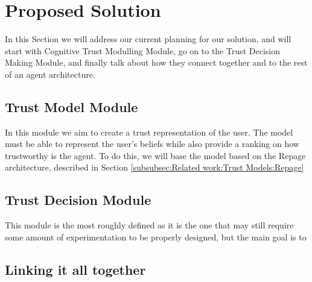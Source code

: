 \section{Proposed Solution}
\label{sec:Solution}
In this Section we will address our current planning for our solution, and will start with Cognitive Trust Modulling Module, go on to the Trust Decision Making Module, and finally talk about how they connect together and to the rest of an agent architecture.


\subsection{Trust Model Module}
\label{subsec:Solution:Trust Assessment Module}
In this module we aim to create a trust representation of the user. The model must be able to represent the user's beliefs while also provide a ranking on how trustworthy is the agent. To do this, we will base the model based on the Repage architecture, described in Section \ref{subsubsec:Related work:Trust Models:Repage}



\subsection{Trust Decision Module}
\label{subsec:Solution:Trust Decision Making Module}
This module is the most roughly defined as it is the one that may still require some amount of experimentation to be properly designed, but the main goal is to 


\subsection{Linking it all together}
\label{subsec:Solution:Linking all together}